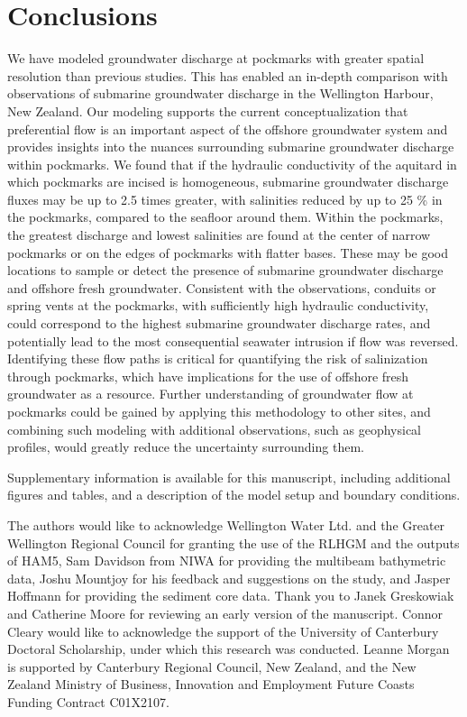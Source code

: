 \documentclass[pdflatex,sn-apa]{sn-jnl}%
\begin{document}
\section{Conclusions}
We have modeled groundwater discharge at pockmarks with greater spatial resolution than previous studies.
This has enabled an in-depth comparison with observations of submarine groundwater discharge in the Wellington Harbour, New Zealand.
Our modeling supports the current conceptualization that preferential flow is an important aspect of the offshore groundwater system and provides insights into the nuances surrounding submarine groundwater discharge within pockmarks.
We found that if the hydraulic conductivity of the aquitard in which pockmarks are incised is homogeneous, submarine groundwater discharge fluxes may be up to 2.5 times greater,
with salinities reduced by up to 25 \% in the pockmarks,
compared to the seafloor around them.
Within the pockmarks, the greatest discharge and lowest salinities are found at the center of narrow pockmarks or on the edges of pockmarks with flatter bases.
These may be good locations to sample or detect the presence of submarine groundwater discharge and offshore fresh groundwater.
Consistent with the observations, conduits or spring vents at the pockmarks, with sufficiently high hydraulic conductivity, could correspond to the highest submarine groundwater discharge rates, and potentially lead to the most consequential seawater intrusion if flow was reversed.
Identifying these flow paths is critical for quantifying the risk of salinization through pockmarks, which have implications for the use of offshore fresh groundwater as a resource.
Further understanding of groundwater flow at pockmarks could be gained by applying this methodology to other sites, and combining such modeling with additional observations, such as geophysical profiles, would greatly reduce the uncertainty surrounding them.


\backmatter

Supplementary information is available for this manuscript, including additional figures and tables, and a description of the model setup and boundary conditions.

The authors would like to acknowledge Wellington Water Ltd. and the Greater Wellington Regional Council for granting the use of the RLHGM and the outputs of HAM5, Sam Davidson from NIWA for providing the multibeam bathymetric data, Joshu Mountjoy for his feedback and suggestions on the study, and Jasper Hoffmann for providing the sediment core data. Thank you to Janek Greskowiak and Catherine Moore for reviewing an early version of the manuscript. Connor Cleary would like to acknowledge the support of the University of Canterbury Doctoral Scholarship, under which this research was conducted. Leanne Morgan is supported by Canterbury Regional Council, New Zealand, and the New Zealand Ministry of Business, Innovation and Employment Future Coasts Funding Contract C01X2107. %
\end{document}
